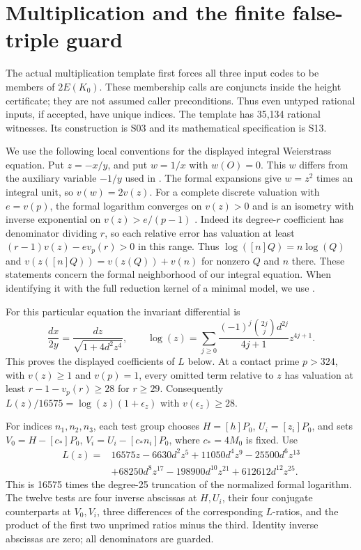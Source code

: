 \documentclass[11pt]{article}
\theoremstyle{definition}
\theoremstyle{remark}
\begin{document}
\section{Multiplication and the finite false-triple guard}\label{sec:mult}
The actual multiplication template first forces all three input codes
to be members of $2E(K_0)$. These membership calls are conjuncts inside
the height certificate; they are not assumed caller preconditions.
Thus even untyped rational inputs, if accepted, have unique indices.
The template has 35,134 rational witnesses. Its construction is S03
and its mathematical specification is S13.

We use the following local conventions for the displayed integral
Weierstrass equation. Put $z=-x/y$, and put $w=1/x$ with $w(O)=0$.
This $w$ differs from the auxiliary variable $-1/y$ used in
\cite[IV.1]{silverman}. The formal expansions give
$w=z^2$ times an integral unit, so $v(w)=2v(z)$.
For a complete discrete valuation with $e=v(p)$, the formal
logarithm converges on $v(z)>0$ and is an isometry with inverse
exponential on $v(z)>e/(p-1)$
\cite[IV.5.5, IV.6.3--6.4, pp.~129--132]{silverman}.
Indeed its degree-$r$ coefficient has denominator dividing $r$,
so each relative error has valuation at least
$(r-1)v(z)-e v_p(r)>0$ in this range.
Thus $\log([n]Q)=n\log(Q)$ and
$v(z([n]Q))=v(z(Q))+v(n)$ for nonzero $Q$ and $n$ there.
These statements concern the formal neighborhood of our integral
equation. When identifying it with the full reduction kernel of
a minimal model, we use
\cite[VII.2.1--2.2, pp.~188--191]{silverman}.

For this particular equation the invariant differential is
\[
 \frac{dx}{2y}=\frac{dz}{\sqrt{1+4d^2z^4}},\qquad
 \log(z)=\sum_{j\ge0}
 \frac{(-1)^j\binom{2j}{j}d^{2j}}{4j+1}z^{4j+1}.
\]
This proves the displayed coefficients of $L$ below. At a contact
prime $p>324$, with $v(z)\ge1$ and $v(p)=1$, every omitted
term relative to $z$ has valuation at least
$r-1-v_p(r)\ge28$ for $r\ge29$.
Consequently $L(z)/16575=\log(z)(1+\epsilon_z)$ with
$v(\epsilon_z)\ge28$.

For indices $n_1,n_2,n_3$, each test group chooses $H=[h]P_0$,
$U_i=[z_i]P_0$, and sets $V_0=H-[c_*]P_0$,
$V_i=U_i-[c_*n_i]P_0$, where $c_*=4M_0$ is fixed. Use
\begin{align*}
 L(z)={}&16575z-6630d^2z^5+11050d^4z^9-25500d^6z^{13}\\
        &+68250d^8z^{17}-198900d^{10}z^{21}+612612d^{12}z^{25}.
\end{align*}
This is 16575 times the degree-25 truncation of the normalized formal
logarithm. The twelve tests are four inverse abscissas at $H,U_i$,
their four conjugate counterparts at $V_0,V_i$, three differences of
the corresponding $L$-ratios, and the product of the first two unprimed
ratios minus the third. Identity inverse abscissas are zero; all
denominators are guarded.
\end{document}

